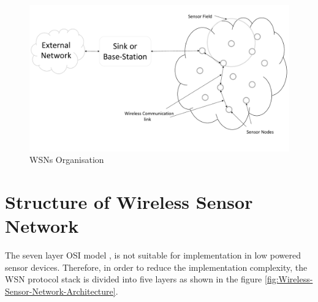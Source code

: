 \begin{figure}
    \centering
    \includegraphics[width=1.0\textwidth]{gfx/WSNDiagram.pdf}
    \caption{\acp{WSN} Organisation}
    \label{fig:wsn-organisation}
\end{figure}


\section{Structure of Wireless Sensor Network}

The seven layer OSI model \cite{zimmermann1980osi}, is not suitable for implementation in low powered sensor devices. Therefore, in order to reduce the implementation complexity, the \ac{WSN} protocol stack is divided into five layers as shown in the figure \ref{fig:Wireless-Sensor-Network-Architecture}.

